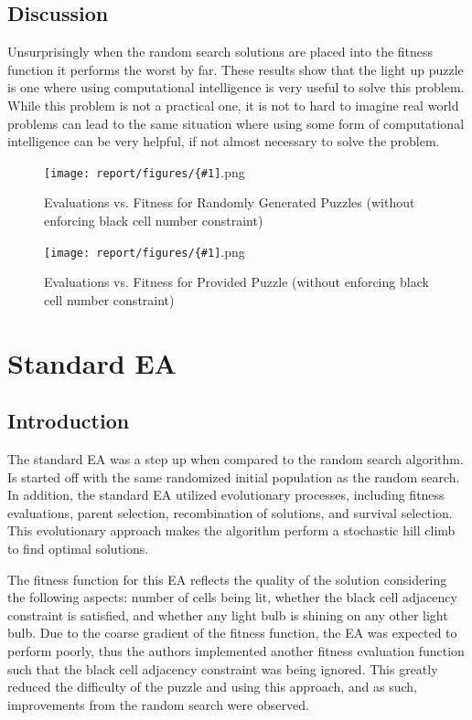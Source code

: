 \documentclass[11pt]{article}
\newcommand{\addgraphic}[1]{\centerline{\texttt{[image: report/figures/\{\#1]}.png}}}
\begin{document}
\subsection{Discussion}
Unsurprisingly when the random search solutions are placed into the fitness function 
it performs the worst by far. These results show that the light up puzzle is one where
using computational intelligence is very useful to solve this problem. While this problem
is not a practical one, it is not to hard to imagine real world problems can lead to the same
situation where using some form of computational intelligence can be very helpful, if not almost 
necessary to solve the problem.


\begin{figure}[H]
    \addgraphic{random_gen_soln_graph}
    \caption{Evaluations vs. Fitness for Randomly Generated Puzzles (without enforcing black cell number constraint)}
    \label{fig:rand_search_rand}
\end{figure}

\begin{figure}[H]
    \addgraphic{website_puzzle_soln_graph}
    \caption{Evaluations vs. Fitness for Provided Puzzle (without enforcing black cell number constraint)}
    \label{fig:rand_search_web}
\end{figure}


\section{Standard EA}

\subsection{Introduction}

The standard EA was a step up when compared to the random search 
algorithm. Is started off with the same randomized initial 
population as the random search. In addition, the 
standard EA utilized evolutionary processes, including 
fitness evaluations, parent selection, recombination 
of solutions, and survival selection. This evolutionary 
approach makes the algorithm perform a stochastic hill 
climb to find optimal solutions. 

The fitness function for this EA reflects the quality of 
the solution considering the following aspects: number 
of cells being lit, whether the black cell adjacency 
constraint is satisfied, and whether any light bulb is 
shining on any other light bulb. Due to the coarse gradient of 
the fitness function, the EA was expected to perform poorly, 
thus the authors implemented another fitness evaluation 
function such that the black cell adjacency constraint was being 
ignored. This greatly reduced the difficulty of the puzzle and 
using this approach, and as such, improvements from the random search were observed.
\end{document}
